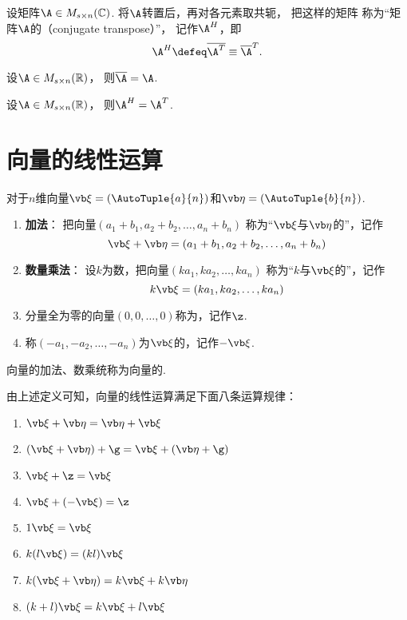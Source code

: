 \begin{definition}
设矩阵\(\A \in M_{s \times n}(\mathbb{C})\).
将\(\A\)转置后，再对各元素取共轭，
把这样的矩阵
称为“矩阵\(\A\)的（conjugate transpose）”，
记作\(\A^H\)，即\[
    \A^H \defeq \overline{\A^T} \equiv \overline{\A}^T.
\]
\end{definition}

\begin{property}
设\(\A \in M_{s \times n}(\mathbb{R})\)，
则\(\overline{\A} = \A\).
\end{property}

\begin{property}
设\(\A \in M_{s \times n}(\mathbb{R})\)，
则\(\A^H = \A^T\).
\end{property}

\section{向量的线性运算}
\begin{definition}
对于\(n\)维向量\(\a = (\AutoTuple{a}{n})\)和\(\b = (\AutoTuple{b}{n})\).
\begin{enumerate}
	\item {\rm\bf 加法}：
	把向量\((a_1+b_1,a_2+b_2,\dotsc,a_n+b_n)\)
	称为“\(\a\)与\(\b\)的”，记作\[
		\a+\b=(a_1+b_1,a_2+b_2,\dotsc,a_n+b_n)
	\]
	\item {\rm\bf 数量乘法}：
	设\(k\)为数，把向量\((k a_1, k a_2, \dotsc, k a_n)\)
	称为“\(k\)与\(\a\)的”，记作\[
		k\a = (k a_1, k a_2, \dotsc, k a_n)
	\]
	\item 分量全为零的向量\((0,0,\dotsc,0)\)称为，记作\(\z\).
	\item 称\((-a_1,-a_2,\dotsc,-a_n)\)为\(\a\)的，记作\(-\a\).
\end{enumerate}

向量的加法、数乘统称为向量的.
\end{definition}

\begin{theorem}
由上述定义可知，向量的线性运算满足下面八条运算规律：
\begin{enumerate}
	\item \(\a + \b = \b + \a\)
	\item \((\a + \b) + \g = \a + (\b + \g)\)
	\item \(\a + \z = \a\)
	\item \(\a + (-\a) = \z\)
	\item \(1 \a = \a\)
	\item \(k(l \a) = (kl) \a\)
	\item \(k(\a + \b) = k\a + k\b\)
	\item \((k+l)\a = k\a + l\a\)
\end{enumerate}
\end{theorem}

